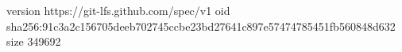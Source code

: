version https://git-lfs.github.com/spec/v1
oid sha256:91c3a2c156705deeb702745ccbe23bd27641c897e57474785451fb560848d632
size 349692
